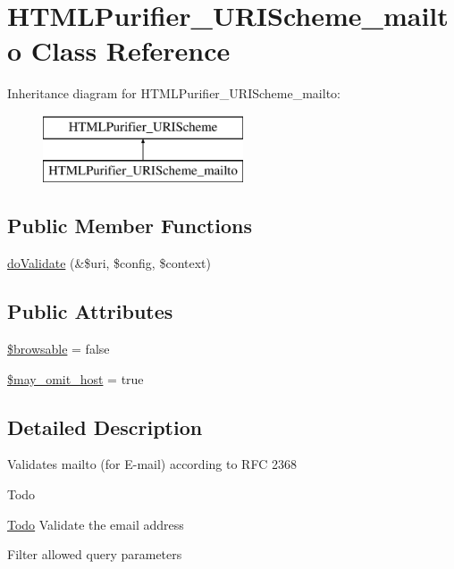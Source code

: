 \hypertarget{classHTMLPurifier__URIScheme__mailto}{\section{H\+T\+M\+L\+Purifier\+\_\+\+U\+R\+I\+Scheme\+\_\+mailto Class Reference}
\label{classHTMLPurifier__URIScheme__mailto}
}
Inheritance diagram for H\+T\+M\+L\+Purifier\+\_\+\+U\+R\+I\+Scheme\+\_\+mailto\+:\begin{figure}[H]
\begin{center}
\leavevmode
\includegraphics[height=2.000000cm]{classHTMLPurifier__URIScheme__mailto}
\end{center}
\end{figure}
\subsection*{Public Member Functions}
\begin{DoxyCompactItemize}
\item 
\hyperlink{classHTMLPurifier__URIScheme__mailto_a9a302434be2d035ac08e604d5f819e60}{do\+Validate} (\&\$uri, \$config, \$context)
\end{DoxyCompactItemize}
\subsection*{Public Attributes}
\begin{DoxyCompactItemize}
\item 
\hyperlink{classHTMLPurifier__URIScheme__mailto_ad49224bf61865346e2a9320a95ba9f03}{\$browsable} = false
\item 
\hyperlink{classHTMLPurifier__URIScheme__mailto_a42ffed0793f1dac2002a7ba48a2df7e7}{\$may\+\_\+omit\+\_\+host} = true
\end{DoxyCompactItemize}


\subsection{Detailed Description}
Validates mailto (for E-\/mail) according to R\+F\+C 2368 \begin{DoxyRefDesc}{Todo}
\item[\hyperlink{todo__todo000034}{Todo}]Validate the email address 

Filter allowed query parameters \end{DoxyRefDesc}


